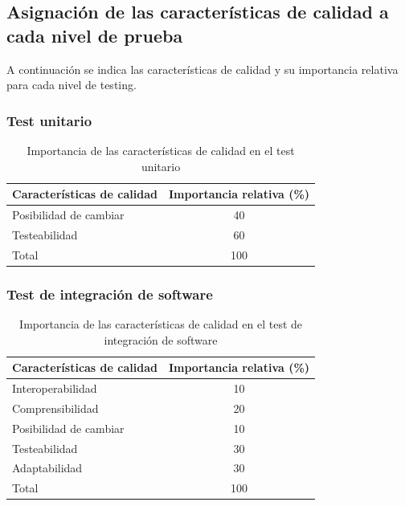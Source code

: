 \documentclass[
11pt, %
codirector, %
]{simple_charter}
\begin{document}
\subsection{Asignación de las características de calidad a cada nivel de prueba}
\label{ssec:asignacion-de-las-caracteristicas-de-calidad-a-cada-nivel-de-prueba}

A continuación se indica las características de calidad y su importancia relativa para cada nivel de
testing.

\subsubsection{Test unitario}
\label{sssec:test-unitario}

\begin{table}[H]
\centering
\begin{tabular}{@{}lc@{}}
\toprule
\textbf{Características de calidad} & \textbf{Importancia relativa (\%)} \\ \midrule
Posibilidad de cambiar              & 40                                 \\
Testeabilidad                       & 60                                 \\
Total                               & 100                                \\ \bottomrule
\end{tabular}
\caption{Importancia de las características de calidad en el test unitario}
\label{tab:ir-unit}
\end{table}

\subsubsection{Test de integración de software}
\label{sssec:test-de-integracion-de-software}

\begin{table}[H]
\centering
\begin{tabular}{@{}lc@{}}
\toprule
\textbf{Características de calidad} & \textbf{Importancia relativa (\%)} \\ \midrule
Interoperabilidad                   & 10                                 \\
Comprensibilidad                    & 20                                 \\
Posibilidad de cambiar              & 10                                 \\
Testeabilidad                       & 30                                 \\
Adaptabilidad                       & 30                                 \\
Total                               & 100                                \\ \bottomrule
\end{tabular}
\caption{Importancia de las características de calidad en el test de integración de software}
\label{tab:ir-int-soft}
\end{table}
\end{document}
